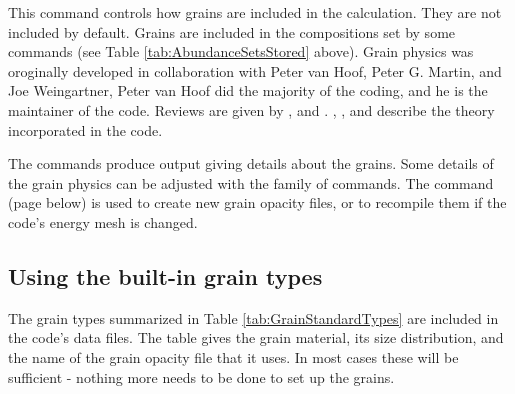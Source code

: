 This command controls how grains are included in the calculation.
They are not included by default.
Grains are included in the compositions set
by some  commands
(see Table \ref{tab:AbundanceSetsStored} above).
Grain physics
was oroginally developed in collaboration with
Peter van Hoof, Peter G. Martin, and
Joe Weingartner, Peter van Hoof did the majority of the coding,
and he is the maintainer of the code.
Reviews are given by \citet{Spitzer1948,Spitzer1978}, and \citet{Martin1979}.
\citet{Baldwin1991},
\citet{Weingartner2001b}, \citet{VanHoof2004} and
\citet{Weingartner2006} describe the theory incorporated in the code.

The  commands produce
output giving details about the grains.
Some details of the grain physics
can be adjusted with the  family of commands.
The  command
(page \pageref{sec:CompileGrains} below) is used to 
create new grain opacity files, or to recompile them if
the code's energy mesh is changed.

\subsection{Using the built-in grain types}

The grain types summarized in Table \ref{tab:GrainStandardTypes} are
included in the code's data files.
The table gives the grain material, its size distribution,
and the name of the grain opacity file that it uses.
In most cases these
will be sufficient - nothing more needs to be done to set up the grains.

